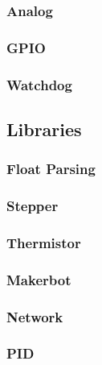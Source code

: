 			\subsubsection{Analog}
			
			\subsubsection{GPIO}
			
			\subsubsection{Watchdog}
			
		\subsection{Libraries}
			
			\subsubsection{Float Parsing}
			
			\subsubsection{Stepper}
			
			\subsubsection{Thermistor}
			
			\subsubsection{Makerbot}
			
			\subsubsection{Network}
			
			\subsubsection{PID}
